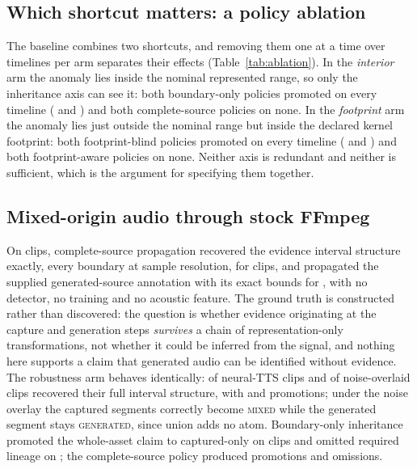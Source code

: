 \documentclass[preprint,3p,11pt,authoryear]{elsarticle}
\begin{document}
\subsection{Which shortcut matters: a policy ablation}
\label{sec:res-ablation}

The baseline combines two shortcuts, and removing them one at a time over
\ABcases{} timelines per arm separates their effects
(Table~\ref{tab:ablation}). In the \emph{interior} arm the anomaly lies inside
the nominal represented range, so only the inheritance axis can see it: both
boundary-only policies promoted on every timeline (\BZeroInterior{} and
\BOneInterior{}) and both complete-source policies on none. In the
\emph{footprint} arm the anomaly lies just outside the nominal range but inside
the declared kernel footprint: both footprint-blind policies promoted on every
timeline (\BZeroFootprint{} and \BTwoFootprint{}) and both footprint-aware
policies on none. Neither axis is redundant and neither is sufficient, which
is the argument for specifying them together.

\begin{table}[t]
\centering
\caption{Policy ablation over \ABcases{} timelines per arm. The interior arm
places the anomaly inside the nominal represented range; the footprint arm places
it outside that range but inside the declared kernel footprint. Each shortcut
fails exactly one arm, and only the full contract clears both.}
\label{tab:ablation}
\small

\end{table}

\subsection{Mixed-origin audio through stock FFmpeg}
\label{sec:res-corpus}

On \Cclips{} clips, complete-source propagation recovered the evidence
interval structure exactly, every boundary at sample resolution, for \Cexact{}
clips, and propagated the supplied generated-source annotation with its exact bounds for \Cgen{},
with no detector, no training and no acoustic feature. The ground truth is
constructed rather than discovered: the question is
whether evidence originating at the capture and generation steps
\emph{survives} a chain of representation-only transformations, not whether it
could be inferred from the signal, and nothing here supports a claim that
generated audio can be identified without evidence. The robustness arm behaves
identically: \CtwoNeuralExact{} of \CtwoNeuralN{} neural-TTS clips and
\CtwoNoiseExact{} of \CtwoNoiseN{} noise-overlaid clips recovered their full
interval structure, with \CtwoNeuralEm{} and \CtwoNoiseEm{} promotions; under
the noise overlay the captured segments correctly become \textsc{mixed} while
the generated segment stays \textsc{generated}, since union adds no atom.
Boundary-only inheritance promoted the whole-asset claim to captured-only on
\Cbase{} clips and omitted required lineage on \CbaseLineage{}; the
complete-source policy produced \Cem{} promotions and \CemLineage{} omissions.
\end{document}
